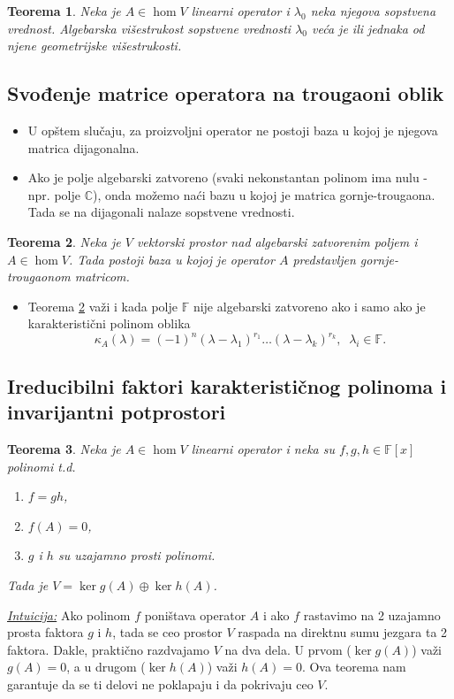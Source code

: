 \documentclass[a4paper,12pt,twoside]{report}
\newtheorem{theorem}{Teorema}[section]
\numberwithin{algorithm}{section}
\begin{document}
\begin{theorem}
    Neka je $A \in \hom V$ linearni operator i $\lambda_0$ neka njegova sopstvena vrednost. Algebarska višestrukost
    sopstvene vrednosti $\lambda_0$ veća je ili jednaka od njene geometrijske višestrukosti.
\end{theorem}

\subsection{Svođenje matrice operatora na trougaoni oblik}

\begin{itemize}
    \item U opštem slučaju, za proizvoljni operator ne postoji baza u kojoj je njegova matrica dijagonalna.
    \item Ako je polje algebarski zatvoreno (svaki nekonstantan polinom ima nulu - npr. polje $\mathbb{C}$), onda možemo naći bazu u kojoj je matrica gornje-trougaona. 
    Tada se na dijagonali nalaze sopstvene vrednosti.
\end{itemize}

\begin{theorem}
    \label{gtm1}
    Neka je $V$ vektorski prostor nad algebarski zatvorenim poljem i $A \in \hom V$. Tada postoji baza u kojoj je 
    operator $A$ predstavljen gornje-trougaonom matricom.
\end{theorem}

\begin{itemize}
    \item Teorema \ref{gtm1} važi i kada polje $\mathbb{F}$ nije algebarski zatvoreno ako i samo ako je karakteristični polinom oblika
    \[ \kappa_A(\lambda) = (-1)^n(\lambda-\lambda_1)^{r_1}\dots (\lambda - \lambda_k)^{r_k}, \;\; \lambda_i \in \mathbb{F}. \]
\end{itemize}
\vfill
\subsection{Ireducibilni faktori karakterističnog polinoma i invarijantni potprostori}

\begin{theorem}
    \label{irfkpiip1}
    Neka je $A \in \hom V$ linearni operator i neka su $f, g, h \in \mathbb{F}[x]$ polinomi t.d.
    \begin{enumerate}
        \item $f = gh$,
        \item $f(A) = 0$,
        \item $g$ i $h$ su uzajamno prosti polinomi.
    \end{enumerate}
    Tada je $V = \ker g(A) \oplus \ker h(A)$.
\end{theorem}
\noindent\underline{\textit{Intuicija:}} Ako polinom $f$ poništava operator $A$ i ako $f$ rastavimo na 2 uzajamno prosta faktora $g$ i $h$, tada se ceo
prostor $V$ raspada na direktnu sumu jezgara ta 2 faktora. Dakle, praktično razdvajamo $V$ na dva dela. U prvom ($\ker g(A)$) važi $g(A) = 0$, a u drugom 
($\ker h(A)$) važi $h(A) = 0$. Ova teorema nam garantuje da se ti delovi ne poklapaju i da pokrivaju ceo $V$.
\end{document}
